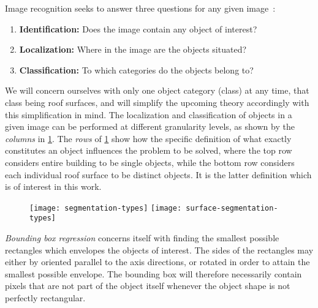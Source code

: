 Image recognition seeks to answer three questions for any given image~\cite{image_recognition}:
%
\begin{enumerate}[]
  \item \textbf{Identification:} Does the image contain any object of interest?
  \item \textbf{Localization:} Where in the image are the objects situated?
  \item \textbf{Classification:} To which categories do the objects belong to?
\end{enumerate}
%
We will concern ourselves with only one object category (class) at any time, that class being roof surfaces, and will simplify the upcoming theory accordingly with this simplification in mind.
The localization and classification of objects in a given image can be performed at different granularity levels, as shown by the \emph{columns} in \cref{fig:segmentation-types}.
The \emph{rows} of \cref{fig:segmentation-types} show how the specific definition of what exactly constitutes an object influences the problem to be solved, where the top row considers entire building to be single objects, while the bottom row considers each individual roof surface to be distinct objects.
It is the latter definition which is of interest in this work.

\begin{figure}[htb]
  \texttt{[image: segmentation-types]}
  \texttt{[image: surface-segmentation-types]}
  \label{fig:segmentation-types}
\end{figure}

\textit{Bounding box regression} concerns itself with finding the smallest possible rectangles which envelopes the objects of interest.
The sides of the rectangles may either by oriented parallel to the axis directions, or rotated in order to attain the smallest possible envelope.
The bounding box will therefore necessarily contain pixels that are not part of the object itself whenever the object shape is not perfectly rectangular.

